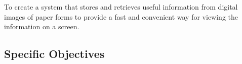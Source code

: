 To create a system that stores and retrieves useful information from digital images of paper forms to provide a fast and convenient way for viewing the information on a screen.   


\subsection{Specific Objectives}
\label{sec:specificobjectives}

%
%



\begin{comment}

This subsection is an elaboration of the general objective.  It states the specific steps that must be undertaken to accomplish the
general objective.  These objectives must be specific, measurable, attainable, realistic, time-bounded.  Each specific objective may
start with ``to design/survey/review/analyze''

Studying a particular programming language or development tool (e.g., to study Windows/Object-Oriented/Graphics/C++ programming) to 
accomplish the general objective is inherent in all thesis and, therefore, must not be included here.


%
%

How to formulate your research objectives:
1. Identify what research steps do you need to perform to achieve your general objective.
2. Identify the questions that must be answered for you to achieve your general objective.
    Thereafter, convert these questions into action statements


Example #1:

Research Question:
  What are the general features of a web-based learning environment?

Specific Objective:
   To review existing web-based learning environment that teaches language learning for children


Example #2:

Research Question:
   How will you represent commonsense knowledge for use by computer systems?

Specific Objective:
   To identify knowledge representation approaches used by existing story generation systems


\end{comment}
